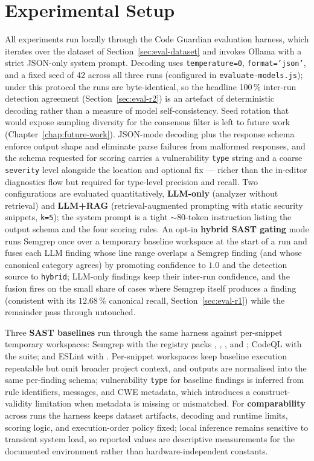 \section{Experimental Setup}
\label{sec:eval-setup}

All experiments run locally through the Code Guardian evaluation harness, which iterates over the dataset of Section~\ref{sec:eval-dataset} and invokes Ollama with a strict JSON-only system prompt. Decoding uses \texttt{temperature=0}, \texttt{format='json'}, and a fixed seed of 42 across all three runs (configured in \texttt{evaluate-models.js}); under this protocol the runs are byte-identical, so the headline 100\,\% inter-run detection agreement (Section~\ref{sec:eval-r2}) is an artefact of deterministic decoding rather than a measure of model self-consistency. Seed rotation that would expose sampling diversity for the consensus filter is left to future work (Chapter~\ref{chap:future-work}). JSON-mode decoding plus the response schema enforce output shape and eliminate parse failures from malformed responses, and the schema requested for scoring carries a vulnerability \texttt{type} string and a coarse \texttt{severity} level alongside the location and optional fix --- richer than the in-editor diagnostics flow but required for type-level precision and recall. Two configurations are evaluated quantitatively, \textbf{LLM-only} (analyzer without retrieval) and \textbf{LLM+RAG} (retrieval-augmented prompting with static security snippets, \texttt{k=5}); the system prompt is a tight ${\sim}80$-token instruction listing the output schema and the four scoring rules. An opt-in \textbf{hybrid SAST gating} mode runs Semgrep once over a temporary baseline workspace at the start of a run and fuses each LLM finding whose line range overlaps a Semgrep finding (and whose canonical category agrees) by promoting confidence to $1.0$ and the detection source to \texttt{hybrid}; LLM-only findings keep their inter-run confidence, and the fusion fires on the small share of cases where Semgrep itself produces a finding (consistent with its $12.68\,\%$ canonical recall, Section~\ref{sec:eval-r1}) while the remainder pass through untouched.

Three \textbf{SAST baselines} run through the same harness against per-snippet temporary workspaces: Semgrep with the registry packs , , , and ; CodeQL with the  suite; and ESLint with . Per-snippet workspaces keep baseline execution repeatable but omit broader project context, and outputs are normalised into the same per-finding schema; vulnerability \texttt{type} for baseline findings is inferred from rule identifiers, messages, and CWE metadata, which introduces a construct-validity limitation when metadata is missing or mismatched. For \textbf{comparability} across runs the harness keeps dataset artifacts, decoding and runtime limits, scoring logic, and execution-order policy fixed; local inference remains sensitive to transient system load, so reported values are descriptive measurements for the documented environment rather than hardware-independent constants.

